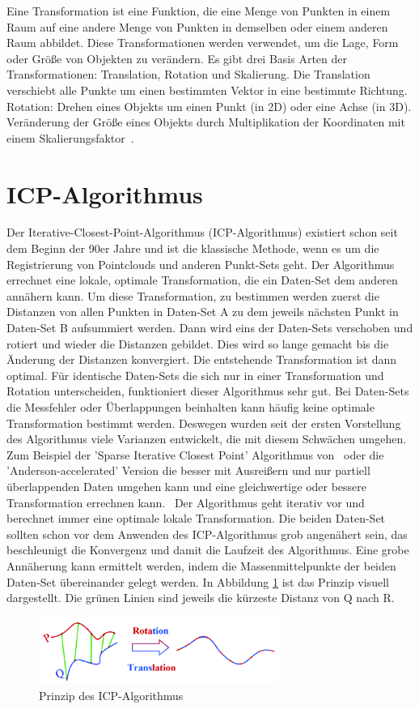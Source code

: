 Eine Transformation ist eine Funktion, die eine Menge von Punkten in einem
Raum auf eine andere Menge von Punkten in demselben oder einem anderen Raum abbildet. 
Diese Transformationen werden verwendet, um die Lage, Form oder Größe von 
Objekten zu verändern.
Es gibt drei Basis Arten der Transformationen:
Translation, Rotation und Skalierung. Die Translation verschiebt alle Punkte 
um einen bestimmten Vektor in eine bestimmte Richtung. 
Rotation: Drehen eines Objekts um einen Punkt (in 2D) oder eine Achse (in 3D).
Veränderung der Größe eines Objekts durch Multiplikation der Koordinaten 
mit einem Skalierungsfaktor~\cite{XiaoleiDu.2009}.

\section{ICP-Algorithmus} \label{icp}

Der Iterative-Closest-Point-Algorithmus (ICP-Algorithmus) existiert schon seit dem Beginn der 90er Jahre und ist 
die klassische Methode, wenn es um die Registrierung von Pointclouds und 
anderen Punkt-Sets geht. \cite{icp}
Der Algorithmus errechnet eine lokale, optimale Transformation, die ein Daten-Set
dem anderen annähern kann. \cite{icp_og}
Um diese Transformation, zu bestimmen werden zuerst die Distanzen von allen 
Punkten in Daten-Set A zu dem jeweils nächsten Punkt in Daten-Set B aufsummiert 
werden. Dann wird eins der Daten-Sets verschoben und rotiert und wieder die 
Distanzen gebildet. Dies wird so lange gemacht bis die Änderung der Distanzen 
konvergiert. Die entstehende Transformation ist dann optimal.
Für identische Daten-Sets die sich nur in einer Transformation und Rotation 
unterscheiden, funktioniert dieser Algorithmus sehr gut. Bei Daten-Sets die 
Messfehler oder Überlappungen beinhalten kann häufig keine optimale 
Transformation bestimmt werden.
Deswegen wurden seit der ersten Vorstellung des Algorithmus viele Varianzen
entwickelt, die mit diesem Schwächen umgehen. 
Zum Beispiel der 'Sparse Iterative Closest Point' Algorithmus von~\cite{Bouaziz.2013}
oder die 'Anderson-accelerated' Version die besser mit Ausreißern und nur 
partiell überlappenden Daten umgehen kann und eine gleichwertige oder bessere 
Transformation errechnen kann.\ \cite{icp}
Der Algorithmus geht iterativ vor und berechnet immer eine optimale lokale Transformation.
Die beiden Daten-Set sollten schon vor dem Anwenden des ICP-Algorithmus grob angenähert sein, 
das beschleunigt die Konvergenz und damit die Laufzeit des Algorithmus.
Eine grobe Annäherung kann ermittelt werden, indem die Massenmittelpunkte der beiden Daten-Set
übereinander gelegt werden. In Abbildung \ref{fig:ipc_princip} ist das Prinzip visuell 
dargestellt. Die grünen Linien sind jeweils die kürzeste Distanz von Q nach R. 

\begin{figure}[h]
    \centering
    \includegraphics[width=0.7\textwidth]{images/Principle-of-ICP-algorithm.png}
    \caption{Prinzip des ICP-Algorithmus}
    \label{fig:ipc_princip}
\end{figure}

